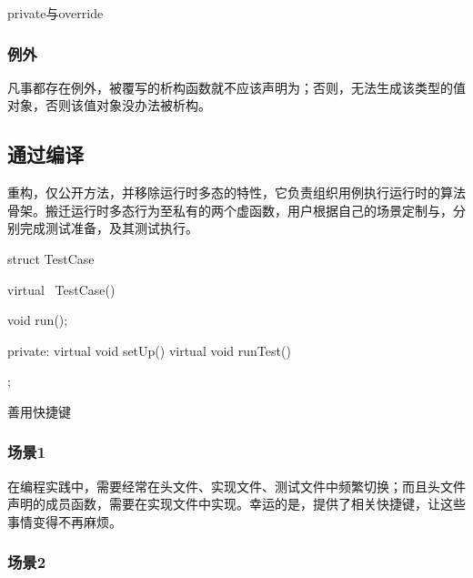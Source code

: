 \begin{content}
\begin{episode}{private与override}
\begin{content}
\subsubsection{例外}

凡事都存在例外，被覆写的析构函数就不应该声明为；否则，无法生成该类型的值对象，否则该值对象没办法被析构。

\end{content}
\end{episode}

\subsection{通过编译}

重构，仅公开方法，并移除运行时多态的特性，它负责组织用例执行运行时的算法骨架。搬迁运行时多态行为至私有的两个虚函数，用户根据自己的场景定制与，分别完成测试准备，及其测试执行。

\begin{leftbar}
 \begin{c++}[caption={\ttfamily{include/mars/core/TestCase.h}}]
struct TestCase {
  virtual ~TestCase() {}

  void run();

private:
  virtual void setUp() {}
  virtual void runTest() {}
};
  \end{c++}
\end{leftbar}

\begin{episode}{善用快捷键}
\begin{content}

\subsubsection{场景1}

在编程实践中，需要经常在头文件、实现文件、测试文件中频繁切换；而且头文件声明的成员函数，需要在实现文件中实现。幸运的是，提供了相关快捷键，让这些事情变得不再麻烦。

\begin{enum}
\end{enum}

\subsubsection{场景2}


\end{content}
\end{episode}
\end{content}
